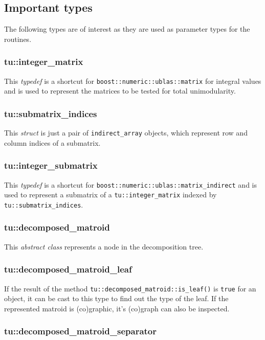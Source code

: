 \documentclass[12pt]{article}
\begin{document}
\subsection{Important types}

The following types are of interest as they are used as parameter types for the routines.

\subsubsection{tu::integer\_matrix}

This {\em typedef} is a shortcut for {\tt boost::numeric::ublas::matrix} for integral values and is used
to represent the matrices to be tested for total unimodularity.

\subsubsection{tu::submatrix\_indices}

This {\em struct} is just a pair of {\tt indirect\_array} objects, which represent row and
column indices of a submatrix.

\subsubsection{tu::integer\_submatrix}

This {\em typedef} is a shortcut for {\tt boost::numeric::ublas::matrix\_indirect} and is used
to represent a submatrix of a {\tt tu::integer\_matrix} indexed by {\tt tu::submatrix\_indices}.

\subsubsection{tu::decomposed\_matroid}

This {\em abstract class} represents a node in the decomposition tree.

\subsubsection{tu::decomposed\_matroid\_leaf}

If the result of the method {\tt tu::decomposed\_matroid::is\_leaf()} is {\tt true} for an object, it can be cast
to this type to find out the type of the leaf. If the represented matroid is (co)graphic, it's (co)graph
can also be inspected.

\subsubsection{tu::decomposed\_matroid\_separator}
\end{document}
